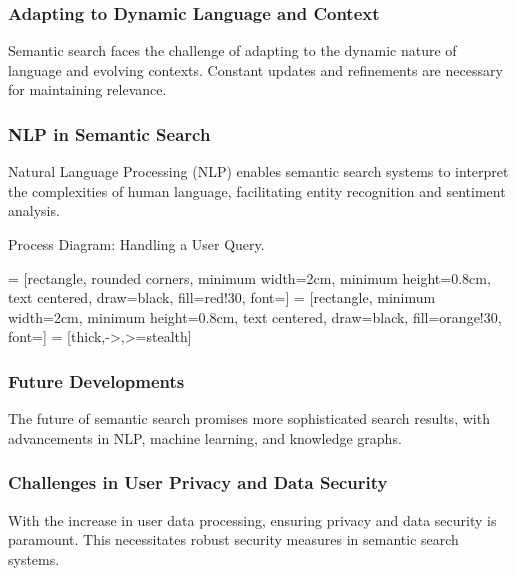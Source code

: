 \documentclass{beamer}
\begin{document}
\begin{frame}
\frametitle{Adapting to Dynamic Language and Context}
Semantic search faces the challenge of adapting to the dynamic nature of language and evolving contexts. Constant updates and refinements are necessary for maintaining relevance.
\end{frame}

\begin{frame}
\frametitle{NLP in Semantic Search}
Natural Language Processing (NLP) enables semantic search systems to interpret the complexities of human language, facilitating entity recognition and sentiment analysis.
\begin{center} 
Process Diagram: Handling a User Query.
\end{center} 
\begin{center} 

 = [rectangle, rounded corners, minimum width=2cm, minimum height=0.8cm, text centered, draw=black, fill=red!30, font=\scriptsize]
 = [rectangle, minimum width=2cm, minimum height=0.8cm, text centered, draw=black, fill=orange!30, font=\scriptsize]
 = [thick,->,>=stealth]

\end{center}

\end{frame}

\begin{frame}
\frametitle{Future Developments}
The future of semantic search promises more sophisticated search results, with advancements in NLP, machine learning, and knowledge graphs.
\end{frame}

\begin{frame}
\frametitle{Challenges in User Privacy and Data Security}
With the increase in user data processing, ensuring privacy and data security is paramount. This necessitates robust security measures in semantic search systems.
\end{frame}
\end{document}
